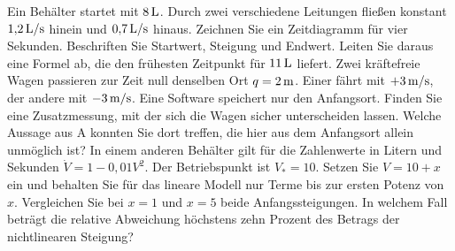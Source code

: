 Ein Behälter startet mit \(8\,\mathrm{L}\). Durch zwei verschiedene Leitungen fließen konstant \(1{,}2\,\mathrm{L/s}\) hinein und \(0{,}7\,\mathrm{L/s}\) hinaus. Zeichnen Sie ein Zeitdiagramm für vier Sekunden. Beschriften Sie Startwert, Steigung und Endwert. Leiten Sie daraus eine Formel ab, die den frühesten Zeitpunkt für \(11\,\mathrm{L}\) liefert.
Zwei kräftefreie Wagen passieren zur Zeit null denselben Ort \(q=2\,\mathrm{m}\). Einer fährt mit \(+3\,\mathrm{m/s}\), der andere mit \(-3\,\mathrm{m/s}\). Eine Software speichert nur den Anfangsort. Finden Sie eine Zusatzmessung, mit der sich die Wagen sicher unterscheiden lassen. Welche Aussage aus A konnten Sie dort treffen, die hier aus dem Anfangsort allein unmöglich ist?
In einem anderen Behälter gilt für die Zahlenwerte in Litern und Sekunden \(\dot V=1-0{,}01V^2\). Der Betriebspunkt ist \(V_*=10\). Setzen Sie \(V=10+x\) ein und behalten Sie für das lineare Modell nur Terme bis zur ersten Potenz von \(x\). Vergleichen Sie bei \(x=1\) und \(x=5\) beide Anfangssteigungen. In welchem Fall beträgt die relative Abweichung höchstens zehn Prozent des Betrags der nichtlinearen Steigung?

\schreibfeld



